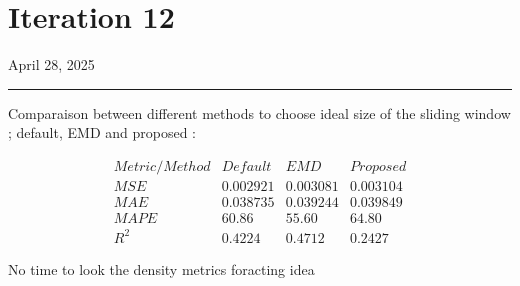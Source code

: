 \documentclass[letterpaper,11pt]{article}
\begin{document}
\newpage
\section*{Iteration 12}
\begin{flushright}
April 28, 2025
\end{flushright}
\hrule
\vspace{0.2in}

Comparaison between different methods to choose ideal size of the sliding window ; default, EMD and proposed :

\bigskip
\[
\begin{array}{cccc}
Metric/Method & Default & EMD & Proposed \\
MSE & 0.002921 & 0.003081 & 0.003104 \\
MAE & 0.038735 & 0.039244 & 0.039849 \\
MAPE & 60.86 & 55.60 & 64.80 \\
R^{2} & 0.4224 & 0.4712 & 0.2427
\end{array}
\]


\bigskip
No time to look the density metrics foracting idea
\end{document}
